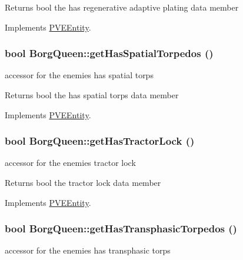 \begin{DoxyReturn}{Returns}
bool the has regenerative adaptive plating data member 
\end{DoxyReturn}


Implements \hyperlink{classPVEEntity}{PVEEntity}.

\hypertarget{classBorgQueen_a45bff6005961ed11202666df5ad0ea5e}{
\subsubsection[{getHasSpatialTorpedos}]{\setlength{\rightskip}{0pt plus 5cm}bool BorgQueen::getHasSpatialTorpedos ()}}
\label{d6/d8d/classBorgQueen_a45bff6005961ed11202666df5ad0ea5e}
accessor for the enemies has spatial torps

\begin{DoxyReturn}{Returns}
bool the has spatial torps data member 
\end{DoxyReturn}


Implements \hyperlink{classPVEEntity}{PVEEntity}.

\hypertarget{classBorgQueen_a81cff66b42f357056b5eba4517b1651a}{
\subsubsection[{getHasTractorLock}]{\setlength{\rightskip}{0pt plus 5cm}bool BorgQueen::getHasTractorLock ()}}
\label{d6/d8d/classBorgQueen_a81cff66b42f357056b5eba4517b1651a}
accessor for the enemies tractor lock

\begin{DoxyReturn}{Returns}
bool the tractor lock data member 
\end{DoxyReturn}


Implements \hyperlink{classPVEEntity}{PVEEntity}.

\hypertarget{classBorgQueen_a934f3c7e409e8e07fc716c53af7027ed}{
\subsubsection[{getHasTransphasicTorpedos}]{\setlength{\rightskip}{0pt plus 5cm}bool BorgQueen::getHasTransphasicTorpedos ()}}
\label{d6/d8d/classBorgQueen_a934f3c7e409e8e07fc716c53af7027ed}
accessor for the enemies has transphasic torps

